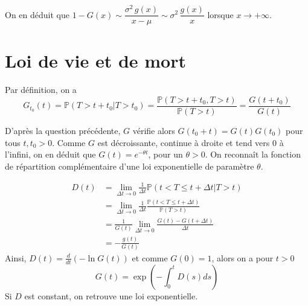 On en déduit que
\(1-G(x) \sim \dfrac{\sigma^2\,g(x)}{x-\mu} \sim \sigma^2\,\dfrac{g(x)}{x}\)
lorsque \(x\to+\infty\).

\section{Loi de vie et de mort}\label{I-loi-de-vie-et-de-mort-1}

\label{I-answer-viemort1}
Par définition, on a
\[ G_{t_0}(t) = \mathbb{P}(T>t+t_0|T>t_0) = \frac{\mathbb{P}(T>t+t_0,T>t)}{\mathbb{P}(T>t)} = \frac{G(t+t_0)}{G(t)}\]

\label{I-answer-viemort2}
D'après la question précédente, \(G\) vérifie alors
\(G(t_0+t) = G(t)G(t_0)\) pour tous \(t, t_0 > 0\). Comme \(G\) est
décroissante, continue à droite et tend vers 0 à l'infini, on en déduit
que \(G(t) = e ^{-\theta t}\), pour un \(\theta > 0\). On reconnaît la
fonction de répartition complémentaire d'une loi exponentielle de
paramètre \(\theta\).

\label{I-answer-viemort3}

\begin{align*}
D(t) &= \lim_{\Delta t \to 0} \frac{1}{\Delta t}\mathbb{P}(t < T \leq t + \Delta t | T >t)\\
     &= \lim_{\Delta t \to 0} \frac{1}{\Delta t}\frac{\mathbb{P}(t < T \leq t + \Delta t)}{\mathbb{P}(T >t)}\\
     &= \frac{1}{G(t)} \lim_{\Delta t \to 0} \frac{G(t) - G(t + \Delta t)}{\Delta t}\\
     &= -\frac{g(t)}{G(t)}
\end{align*} Ainsi, \(D(t) = \frac{d}{dt}(-\ln G(t))\) et comme
\(G(0) = 1\), alors on a pour \(t >0\)
\[G(t) = \exp\left(-\int_0^tD(s) ds\right)\] Si \(D\) est constant, on
retrouve une loi exponentielle.
